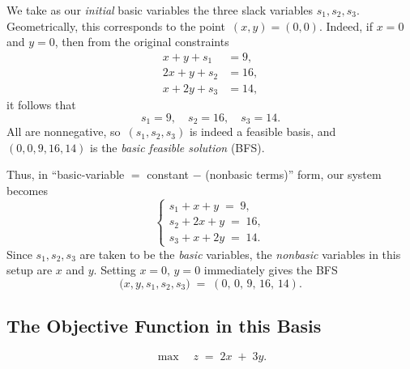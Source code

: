 We take as our \emph{initial} basic variables the three slack variables \(s_1, s_2, s_3\).  Geometrically, this corresponds to the point \(\,(x,y)=(0,0)\).  Indeed, if \(x=0\) and \(y=0\), then from the original constraints
\[
\begin{aligned}
  x + y + s_1 &= 9,\\
  2x + y + s_2 &= 16,\\
  x + 2y + s_3 &= 14,
\end{aligned}
\]
it follows that
\[
s_1 = 9,
\quad
s_2 = 16,
\quad
s_3 = 14.
\]
All are nonnegative, so \(\,(s_1,s_2,s_3)\) is indeed a feasible basis, and \((0,0,9,16,14)\) is the \emph{basic feasible solution} (BFS).

Thus, in ``basic-variable \(=\) constant \(-\) (nonbasic terms)'' form, our system becomes
\[
\begin{cases}
s_1 + x + y \;=\; 9,\\
s_2 + 2x + y \;=\; 16,\\
s_3 + x + 2y \;=\; 14.
\end{cases}
\]
Since \(s_1, s_2, s_3\) are taken to be the \emph{basic} variables, the \emph{nonbasic} variables in this setup are \(x\) and \(y\).  Setting \(x=0,\,y=0\) immediately gives the BFS
\[
\bigl(x,y,s_1,s_2,s_3\bigr)
\;=\;
(0,\,0,\,9,\,16,\,14).
\]

\subsection*{The Objective Function in this Basis}
%
\[
\max\quad z \;=\; 2x \;+\; 3y.
\]
%
%
%
